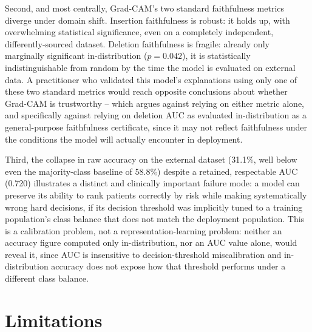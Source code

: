 \documentclass[conference]{IEEEtran}
\begin{document}
Second, and most centrally, Grad-CAM's two standard faithfulness metrics diverge under domain shift. Insertion faithfulness is robust: it holds up, with overwhelming statistical significance, even on a completely independent, differently-sourced dataset. Deletion faithfulness is fragile: already only marginally significant in-distribution ($p = 0.042$), it is statistically indistinguishable from random by the time the model is evaluated on external data. A practitioner who validated this model's explanations using only one of these two standard metrics would reach opposite conclusions about whether Grad-CAM is trustworthy -- which argues against relying on either metric alone, and specifically against relying on deletion AUC as evaluated in-distribution as a general-purpose faithfulness certificate, since it may not reflect faithfulness under the conditions the model will actually encounter in deployment.

Third, the collapse in raw accuracy on the external dataset (31.1\%, well below even the majority-class baseline of 58.8\%) despite a retained, respectable AUC (0.720) illustrates a distinct and clinically important failure mode: a model can preserve its ability to rank patients correctly by risk while making systematically wrong hard decisions, if its decision threshold was implicitly tuned to a training population's class balance that does not match the deployment population. This is a calibration problem, not a representation-learning problem: neither an accuracy figure computed only in-distribution, nor an AUC value alone, would reveal it, since AUC is insensitive to decision-threshold miscalibration and in-distribution accuracy does not expose how that threshold performs under a different class balance.

\section{Limitations}
\end{document}
